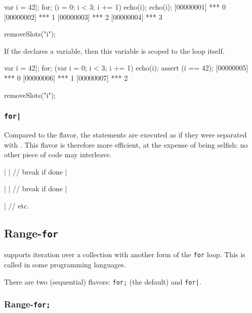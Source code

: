 \begin{urbiscript}
var i = 42|;
for; (i = 0; i < 3; i += 1)
  echo(i);
echo(i);
[00000001] *** 0
[00000002] *** 1
[00000003] *** 2
[00000004] *** 3
\end{urbiscript}
\begin{urbicomment}
removeSlots("i");
\end{urbicomment}


If the  declares a variable, then this variable is
scoped to the loop itself.
\begin{urbiscript}
var i = 42|;
for; (var i = 0; i < 3; i += 1)
  echo(i);
assert (i == 42);
[00000005] *** 0
[00000006] *** 1
[00000007] *** 2
\end{urbiscript}
\begin{urbicomment}
removeSlots("i");
\end{urbicomment}


\subsubsection{\lstinline{for|}}
\label{sec:lang:forc:pipe}
Compared to the \samp{;} flavor, the statements are executed as if they were
separated with \samp{|}.  This flavor is therefore more efficient, at the
expense of being selfish: no other piece of code may interleave.

\begin{urbiunchecked}
|
|      // break if done
|

|
|      // break if done
|

|
// etc.
\end{urbiunchecked}

\subsection{Range-\lstinline{for}}
\label{sec:lang:foreach}

\us supports iteration over a collection with another form of the
\lstinline{for} loop.  This is called  in some
programming languages.



There are two (sequential) flavors: \lstinline{for;} (the default) and
\lstinline{for|}.

\subsubsection{Range-\lstinline{for;}}
\label{sec:lang:foreach:semi}

